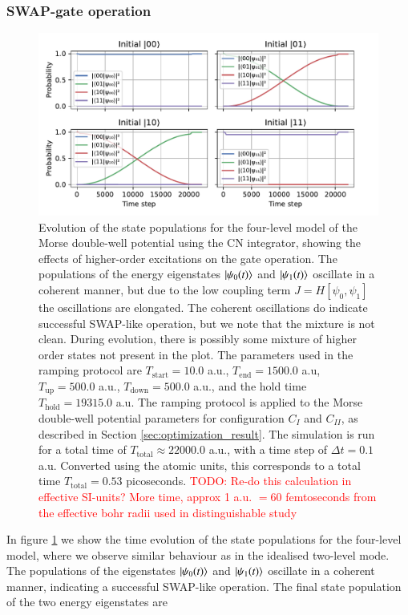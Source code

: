 \documentclass{subfiles}
\begin{document}
\subsubsection*{SWAP-gate operation}
\begin{figure}[h!]
    \centering
    \includegraphics[width=1.0\textwidth]{figs/time_evolution_4_basefunctions_2306_SWAP.pdf}
    \caption{Evolution of the state populations for the four-level model of the Morse double-well potential using the CN integrator, showing the effects of higher-order excitations on the gate operation. The populations of the energy eigenstates $\ket{\psi_0(t)}$ and $\ket{\psi_1(t)}$ oscillate in a coherent manner, but due to the low coupling term $J=H[\psi_0, \psi_1]$ the oscillations are elongated. The coherent oscillations do indicate successful SWAP-like operation, but we note that the mixture is not clean. During evolution, there is possibly some mixture of higher order states not present in the plot.
    The parameters used in the ramping protocol are $T_{\text{start}} = 10.0$ a.u., $T_{\text{end}} = 1500.0$ a.u, $T_{\text{up}} = 500.0$ a.u., $T_{\text{down}} = 500.0$ a.u., and the hold time $T_{\text{hold}} = 19 315.0$ a.u. The ramping protocol is applied to the Morse double-well potential parameters for configuration $C_I$ and $C_{II}$, as described in Section \ref{sec:optimization_result}. The simulation is run for a total time of $T_{\text{total}} \approx 22 000.0$ a.u., with a time step of $\Delta t = 0.1$ a.u. Converted using the atomic units, this corresponds to a total time $T_{\text{total}}=0.53$ picoseconds. \textcolor{red}{TODO: Re-do this calculation in effective SI-units? More time, approx 1 a.u. $=60$ femtoseconds from the effective bohr radii used in distinguishable study}
    }
    \label{fig:time_evolution_4_basefunctions}
\end{figure}
In figure \ref{fig:time_evolution_4_basefunctions} we show the time evolution of the state populations for the four-level model, where we observe similar behaviour as in the idealised two-level mode. The populations of the eigenstates $\ket{\psi_0(t)}$ and $\ket{\psi_1(t)}$ oscillate in a coherent manner, indicating a successful SWAP-like operation. The final state population of the two energy eigenstates are
\end{document}
